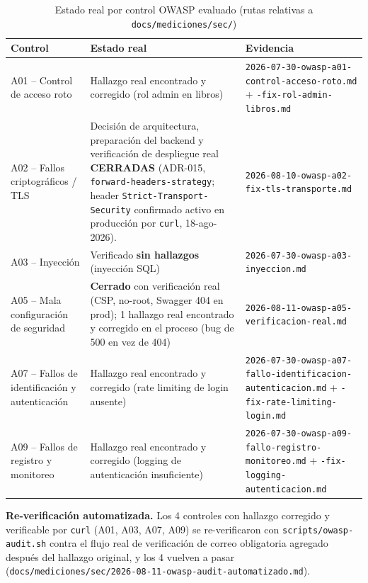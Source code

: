 \begin{table}[h]
\centering
\scriptsize
\begin{tabularx}{\linewidth}{@{}p{2.3cm}X p{3.5cm}@{}}
\toprule
Control & Estado real & Evidencia \\
\midrule
A01 -- Control de acceso roto & Hallazgo real encontrado y corregido (rol admin en libros) & \texttt{2026-07-30-owasp-a01-\allowbreak control-acceso-roto.md} + \texttt{-fix-rol-admin-\allowbreak libros.md} \\
A02 -- Fallos criptográficos / TLS & Decisión de arquitectura, preparación del backend y verificación de despliegue real \textbf{CERRADAS} (ADR-015, \texttt{forward-headers-strategy}; header \texttt{Strict-Transport-Security} confirmado activo en producción por \texttt{curl}, 18-ago-2026). & \texttt{2026-08-10-owasp-a02-\allowbreak fix-tls-\allowbreak transporte.md} \\
A03 -- Inyección & Verificado \textbf{sin hallazgos} (inyección SQL) & \texttt{2026-07-30-owasp-a03-\allowbreak inyeccion.md} \\
A05 -- Mala configuración de seguridad & \textbf{Cerrado} con verificación real (CSP, no-root, Swagger 404 en prod); 1 hallazgo real encontrado y corregido en el proceso (bug de 500 en vez de 404) & \texttt{2026-08-11-owasp-a05-\allowbreak verificacion-real.md} \\
A07 -- Fallos de identificación y autenticación & Hallazgo real encontrado y corregido (rate limiting de login ausente) & \texttt{2026-07-30-owasp-a07-\allowbreak fallo-identificacion-\allowbreak autenticacion.md} + \texttt{-fix-rate-\allowbreak limiting-login.md} \\
A09 -- Fallos de registro y monitoreo & Hallazgo real encontrado y corregido (logging de autenticación insuficiente) & \texttt{2026-07-30-owasp-a09-\allowbreak fallo-registro-\allowbreak monitoreo.md} + \texttt{-fix-logging-\allowbreak autenticacion.md} \\
\bottomrule
\end{tabularx}
\caption{Estado real por control OWASP evaluado (rutas relativas a \texttt{docs/mediciones/sec/})}
\label{tab:res-owasp}
\end{table}

\textbf{Re-verificación automatizada.} Los 4 controles con hallazgo
corregido y verificable por \texttt{curl} (A01, A03, A07, A09) se
re-verificaron con \texttt{scripts/owasp-audit.sh} contra el flujo real
de verificación de correo obligatoria agregado después del hallazgo
original, y los 4 vuelven a pasar
(\texttt{docs/mediciones/sec/2026-08-11-owasp-audit-automatizado.md}).

